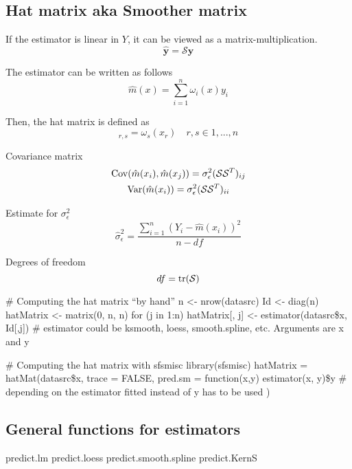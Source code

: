 \subsection{Hat matrix aka Smoother matrix}
\label{subsec:hatMatrix}
\begin{theory}
If the estimator is linear in $Y$, it can be viewed as a matrix-multiplication.
\begin{equation*}
 \hat{\mathbf{y}} = \mathcal{S}\mathbf{y}
\end{equation*}

The estimator can be written as follows
\begin{equation*}
 \hat{m}(x) = \sum_{i=1}^n \omega_i(x)y_i
\end{equation*}

Then, the hat matrix is defined as
\begin{equation*}
 [\mathcal{S}]_{r,s} = \omega_s(x_r)\quad r,s \in {1, ..., n}
\end{equation*}

Covariance matrix
\begin{subequations}
 \begin{gather*}
  \operatorname{Cov}(\hat{m}(x_i), \hat{m}(x_j)) = \sigma_\epsilon^2(\mathcal{S}\mathcal{S}^T)_{ij}\\
  \operatorname{Var}(\hat{m}(x_i)) = \sigma_\epsilon^2(\mathcal{S}\mathcal{S}^T)_{ii}
 \end{gather*}
\end{subequations}

Estimate for $\sigma_\epsilon^2$
\begin{equation*}
 \hat{\sigma}_\epsilon^2 = \frac{\sum_{i=1}^n (Y_i - \hat{m}(x_i))^2}{n - df}
\end{equation*}

Degrees of freedom
\begin{equation*}
 df = \operatorname{tr}(\mathcal{S})
\end{equation*}

\end{theory}

\begin{code}
 # Computing the hat matrix ``by hand''
 n <- nrow(datasrc)
 Id <- diag(n)
 hatMatrix <- matrix(0, n, n)
 for (j in 1:n)
   hatMatrix[, j] <- estimator(datasrc\$x, Id[,j]) # estimator could be ksmooth, loess, smooth.spline, etc. Arguments are x and y

 # Computing the hat matrix with sfsmisc
 library(sfsmisc)
 hatMatrix = hatMat(datasrc\$x, trace = FALSE,
             pred.sm = function(x,y) estimator(x, y)\$y # depending on the estimator fitted instead of y has to be used
 )
\end{code}

\subsection{General functions for estimators}
\begin{code}
 predict.lm
 predict.loess
 predict.smooth.spline
 predict.KernS
\end{code}
